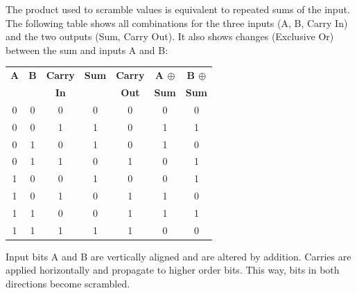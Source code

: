 \documentclass[letterpaper]{article}
\begin{document}
\begin{multicols}{2}
    The product used to scramble values is equivalent to repeated sums of the input. The following table shows all combinations for the three inputs (A, B, Carry In) and the two outputs (Sum, Carry Out). It also shows changes (Exclusive Or) between the sum and inputs A and B:

    \noindent
    \begin{minipage}{\columnwidth}
        \setlength{\tabcolsep}{.35\tabcolsep}
        \centering
        \begin{tabular}{|c c c|c c|c c|}
            \hline
            \textbf{A} & \textbf{B} & \textbf{Carry} & \textbf{Sum} & \textbf{Carry} & \textbf{A $\oplus$} & \textbf{B $\oplus$} \\
                       &            & \textbf{In}    &              & \textbf{Out}   & \textbf{Sum}        & \textbf{Sum}        \\
            \hline
            0          & 0          & 0              & 0            & 0              & 0                   & 0                   \\
            0          & 0          & 1              & 1            & 0              & 1                   & 1                   \\
            0          & 1          & 0              & 1            & 0              & 1                   & 0                   \\
            0          & 1          & 1              & 0            & 1              & 0                   & 1                   \\
            1          & 0          & 0              & 1            & 0              & 0                   & 1                   \\
            1          & 0          & 1              & 0            & 1              & 1                   & 0                   \\
            1          & 1          & 0              & 0            & 1              & 1                   & 1                   \\
            1          & 1          & 1              & 1            & 1              & 0                   & 0                   \\
            \hline
        \end{tabular}
    \end{minipage}

    Input bits A and B are vertically aligned and are altered by addition. Carries are applied horizontally and propagate to higher order bits. This way, bits in both directions become scrambled.


\end{multicols}
\end{document}
